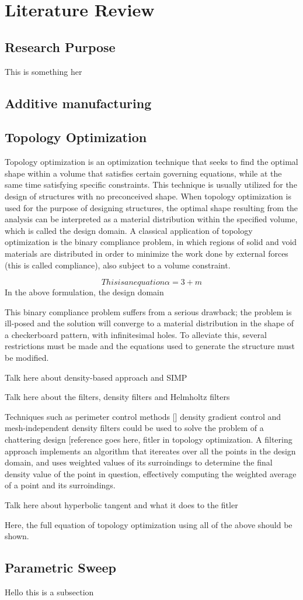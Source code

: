 \documentclass{article}
\begin{document}
\section{Literature Review}

\subsection{Research Purpose}
 
This is something her

\subsection{Additive manufacturing}

\subsection{Topology Optimization}

Topology optimization is an optimization technique that seeks to find the optimal shape within a volume that satisfies certain governing equations, while at the same time satisfying specific constraints. This technique is usually utilized for the design of structures with no preconceived shape. When topology optimization is used for the purpose of designing structures, the optimal shape resulting from the analysis can be interpreted as a material distribution within the specified volume, which is called the design domain. A classical application of topology optimization is the binary compliance problem, in which regions of solid and void materials are distributed in order to minimize the work done by external forces (this is called compliance), also subject to a volume constraint. 

$$ This is an equation \alpha = 3 + m $$
In the above formulation, the design domain 

This binary compliance problem suffers from a serious drawback; the problem is ill-posed and the solution will converge to a material distribution in the shape of a checkerboard pattern, with infinitesimal holes. To alleviate this, several restrictions must be made  and the equations used to generate the structure must be modified. 

Talk here about density-based approach and SIMP 

Talk here about the filters, density filters and Helmholtz filters

Techniques such as perimeter control methods [] density gradient control 
and mesh-independent density filters could be used to solve the problem of a chattering design [reference goes here, fitler in topology optimization. A filtering approach implements an algorithm that itereates over all the points in the design domain, and uses weighted values of its surroindings to determine the final density value of the point in question, effectively computing the weighted average of a point and its surroindings.

Talk here about hyperbolic tangent and what it does to the fitler

Here, the full equation of topology optimization using all of the above should be shown.

\subsection{Parametric Sweep}

Hello this is a subsection
\end{document}
